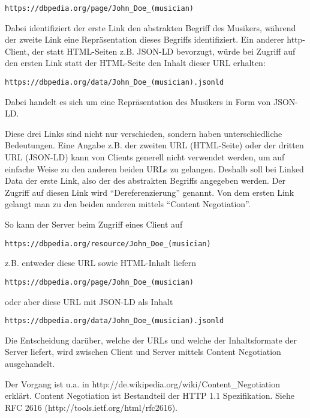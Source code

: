 \documentclass[,a4paper]{article}
\begin{document}
\begin{verbatim}
https://dbpedia.org/page/John_Doe_(musician)
\end{verbatim}

Dabei identifiziert der erste Link den abstrakten Begriff des Musikers,
während der zweite Link eine Repräsentation dieses Begriffs
identifiziert. Ein anderer http-Client, der statt HTML-Seiten z.B.
JSON-LD bevorzugt, würde bei Zugriff auf den ersten Link statt der
HTML-Seite den Inhalt dieser URL erhalten:

\begin{verbatim}
https://dbpedia.org/data/John_Doe_(musician).jsonld
\end{verbatim}

Dabei handelt es sich um eine Repräsentation des Musikers in Form von
JSON-LD.

Diese drei Links sind nicht nur verschieden, sondern haben
unterschiedliche Bedeutungen. Eine Angabe z.B. der zweiten URL
(HTML-Seite) oder der dritten URL (JSON-LD) kann von Clients generell
nicht verwendet werden, um auf einfache Weise zu den anderen beiden URLs
zu gelangen. Deshalb soll bei Linked Data der erste Link, also der des
abstrakten Begriffs angegeben werden. Der Zugriff auf diesen Link wird
``Dereferenzierung'' genannt. Von dem ersten Link gelangt man zu den
beiden anderen mittels ``Content Negotiation''.

So kann der Server beim Zugriff eines Client auf

\begin{verbatim}
https://dbpedia.org/resource/John_Doe_(musician)
\end{verbatim}

z.B. entweder diese URL sowie HTML-Inhalt liefern

\begin{verbatim}
https://dbpedia.org/page/John_Doe_(musician)
\end{verbatim}

oder aber diese URL mit JSON-LD als Inhalt

\begin{verbatim}
https://dbpedia.org/data/John_Doe_(musician).jsonld
\end{verbatim}

Die Entscheidung darüber, welche der URLs und welche der Inhaltsformate
der Server liefert, wird zwischen Client und Server mittels Content
Negotiation ausgehandelt.

Der Vorgang ist u.a. in
http://de.wikipedia.org/wiki/Content\_Negotiation erklärt. Content
Negotiation ist Bestandteil der HTTP 1.1 Spezifikation. Siehe RFC 2616
(http://tools.ietf.org/html/rfc2616).
\end{document}
